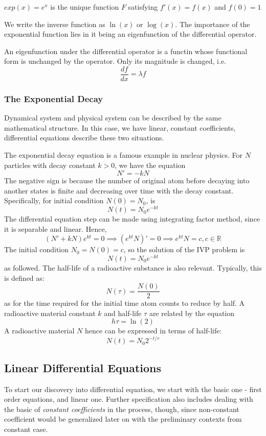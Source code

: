 \begin{definition}[Exponential]
    $exp(x)=e^{x}$ is the unique function $F$ satisfying $f'(x)=f(x)$ and $f(0)=1$
\end{definition}

We write the inverse function as $\ln{(x)}$ or $\log{(x)}$. The importance of the exponential function lies in it being an eigenfunction of the differential operator. 
\begin{definition}[Eigenfunction]
    An eigenfunction under the differential operator is a functin whose functional form is unchanged by the operator. Only its magnitude is changed, i.e. 
    \begin{equation}
        \frac{df}{dx} = \lambda f
    \end{equation}
\end{definition}

\subsubsection{The Exponential Decay}

Dynamical system and physical system can be described by the same mathematical structure. In this case, we have linear, constant coefficients, differential equations describe these two situations. 

The exponential decay equation is a famous example in nuclear physics. For $N$ particles with decay constant $k>0$, we have the equation $$N'=-kN$$
The negative sign is because the number of original atom before decaying into another states is finite and decreasing over time with the decay constant. Specifically, for initial condition $N(0)=N_{0}$, is $$N(t)=N_{0}e^{-kt}$$
The differential equation step can be made using integrating factor method, since it is separable and linear. Hence, $$(N'+kN)e^{kt}=0\implies (e^{kt}N)' =0\implies e^{kt}N=c,c\in \mathbb{R}$$
The initial condition $N_{0}=N(0)=c$, so the solution of the IVP problem is $$N(t)=N_{0}e^{-kt}$$ as followed. 
The half-life of a radioactive substance is also relevant. Typically, this is defined as: $$N(\tau)=\frac{N(0)}{2}$$ as for the time required for the initial time atom counts to reduce by half. 
A radioactive material constant $k$ and half-life $\tau$ are related by the equation $$h\tau=\ln{(2)}$$
A radioactive material $N$ hence can be expressed in terms of half-life: 
$$N(t)=N_{0}2^{-t/r}$$


\subsection{Linear Differential Equations}
To start our discovery into differential equation, we start with the basic one - first order equations, and linear one. Further specification also includes dealing with the basic of \textit{constant coefficients} in the process, though, since non-constant coefficient would be generalized later on with the preliminary contexts from constant case. 

